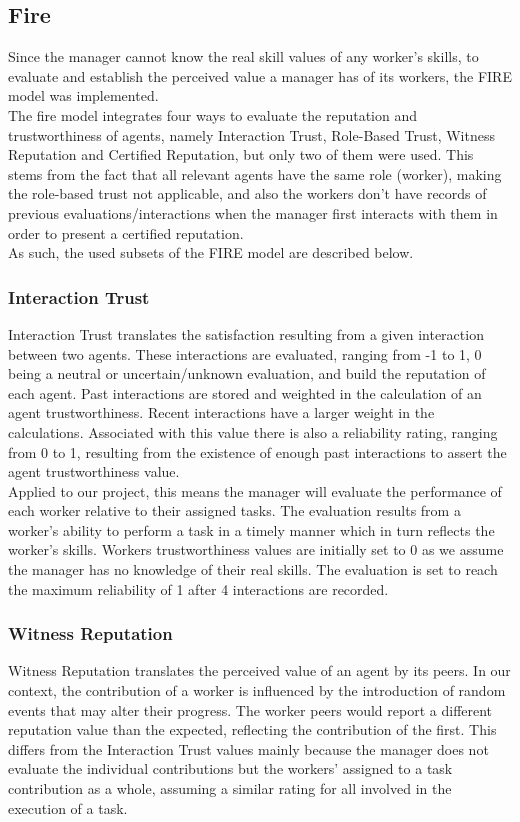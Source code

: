 \documentclass[paper=a4, fontsize=11pt]{scrartcl} %
\numberwithin{equation}{section} %
\numberwithin{figure}{section} %
\numberwithin{table}{section} %
\begin{document}
\subsection{Fire}
Since the manager cannot know the real skill values of any worker's skills, to evaluate and establish the perceived value a manager has of its workers, the FIRE model was implemented.\\
The fire model integrates four ways to evaluate the reputation and trustworthiness of agents, namely Interaction Trust, Role-Based Trust, Witness Reputation and Certified Reputation, but only two of them were used. This stems from the fact that all relevant agents have the same role (worker), making the role-based trust not applicable, and also the workers don't have records of previous evaluations/interactions when the manager first interacts with them in order to present a certified reputation.\\
As such, the used subsets of the FIRE model are described below.
\subsubsection{Interaction Trust}
Interaction Trust translates the satisfaction resulting from a given interaction between two agents. These interactions are evaluated, ranging from -1 to 1, 0 being a neutral or uncertain/unknown evaluation, and build the reputation of each agent. Past interactions are stored and weighted in the calculation of an agent trustworthiness. Recent interactions have a larger weight in the calculations. Associated with this value there is also a reliability rating, ranging from 0 to 1, resulting from the existence of enough past interactions to assert the agent trustworthiness value.\\
Applied to our project, this means the manager will evaluate the performance of each worker relative to their assigned tasks. The evaluation results from a worker's ability to perform a task in a timely manner which in turn reflects the worker's skills. Workers trustworthiness values are initially set to 0 as we assume the manager has no knowledge of their real skills. The evaluation is set to reach the maximum reliability of 1 after 4 interactions are recorded.
\subsubsection{Witness Reputation}
Witness Reputation translates the perceived value of an agent by its peers. In our context, the contribution of a worker is influenced by the introduction of random events that may alter their progress. The worker peers would report a different reputation value than the expected, reflecting the contribution of the first. This differs from the Interaction Trust values mainly because the manager does not evaluate the individual contributions but the workers' assigned to a task contribution as a whole, assuming a similar rating for all involved in the execution of a task.
\end{document}
